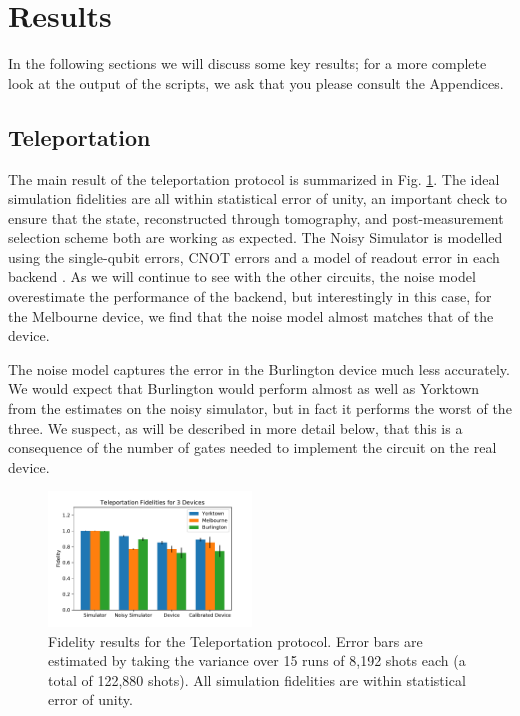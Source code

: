 \section{Results} In the following sections we will discuss some key results;
for a more complete look at the output of the scripts, we ask that you please
consult the Appendices.

\subsection{Teleportation} The main result of the teleportation protocol is
summarized in Fig. \ref{fig:teleport_histogram}. The ideal simulation fidelities
are all within statistical error of unity, an important check to ensure that the
state, reconstructed through tomography, and post-measurement selection scheme
both are working as expected. The Noisy Simulator is modelled using the
single-qubit errors, CNOT errors and a model of readout error in each backend
\cite{qiskit_org}. As we will continue to see with the other circuits, the noise
model overestimate the performance of the backend, but interestingly in this
case, for the Melbourne device, we find that the noise model almost matches that
of the device.

The noise model captures the error in the Burlington device much less
accurately. We would expect that Burlington would perform almost as well as
Yorktown from the estimates on the noisy simulator, but in fact it performs the
worst of the three. We suspect, as will be described in more detail below, that
this is a consequence of the number of gates needed to implement the circuit on
the real device.

\begin{figure}[h] \centering
\includegraphics[width=0.48\textwidth]{images/results/teleport_histogram.pdf}
  \caption{Fidelity results for the Teleportation protocol. Error bars are
estimated by taking the variance over 15 runs of 8,192 shots each (a total of
122,880 shots). All simulation fidelities are within statistical error of
unity.}
  \label{fig:teleport_histogram}
\end{figure}

